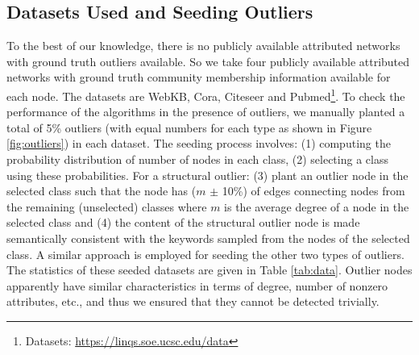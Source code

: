 \documentclass[letterpaper]{article} %
\begin{document}
\subsection{Datasets Used and Seeding Outliers}
To the best of our knowledge, there is no publicly available attributed networks with ground truth outliers available. So we take four publicly available attributed networks with ground truth community membership information available for each node. The datasets are WebKB, Cora, Citeseer and Pubmed\footnote[2]{Datasets: \url{https://linqs.soe.ucsc.edu/data}}. 
To check the performance of the algorithms in the presence of outliers, we manually planted a total of 5\% outliers (with equal numbers for each type as shown in Figure \ref{fig:outliers}) in each dataset. The seeding process involves: (1) computing the probability distribution of number of nodes in each class, (2) selecting a class using these probabilities. For a structural outlier: (3) plant an outlier node in the selected class such that the node has ($m$ $\pm$ 10\%) of edges connecting nodes from the remaining (unselected) classes where $m$ is the average degree of a node in the selected class and (4) the content of the structural outlier node is made semantically consistent with the keywords sampled from the nodes of the selected class.
A similar approach is employed for seeding the other two types of outliers.
The statistics of these seeded datasets are given in Table \ref{tab:data}.
Outlier nodes apparently have similar characteristics in terms of degree, number of nonzero attributes, etc., and thus we ensured that they cannot be detected trivially.

\begin{table}
    \caption{Summary of the datasets (after planting outliers).} %
	\centering
	\label{tab:data}
	\end{table} %
\end{document}
